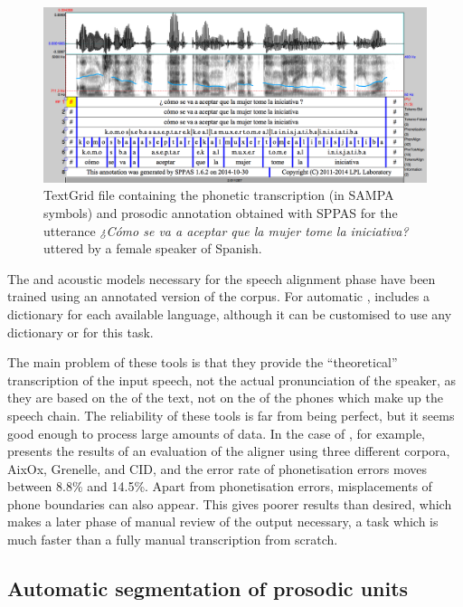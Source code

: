 \documentclass[output=paper]{langsci/langscibook}
\begin{document}
\begin{figure}
\includegraphics[width=\textwidth]{figures/GAR-img001.png}
\caption{TextGrid file containing the phonetic transcription (in SAMPA symbols) and prosodic annotation obtained with SPPAS for the utterance \textit{¿Cómo se va a aceptar que la mujer tome la iniciativa?} uttered by a female speaker of Spanish.}
\label{fig:gar:1}
\end{figure}

The  and  acoustic models necessary for the speech alignment phase have been trained using an annotated version of the  corpus. For automatic ,  includes a  dictionary for each available language, although it can be customised to use any dictionary or   for this task.\largerpage

The main problem of these tools is that they provide the ``theoretical'' transcription of the input speech, not the actual pronunciation of the speaker, as they are based on the  of the text, not on the  of the phones which make up the speech chain. The reliability of these tools is far from being perfect, but it seems good enough to process large amounts of data. In the case of , for example, \citet{Bigi2012SPPAS} presents the results of an evaluation of the  aligner using three different corpora, AixOx, Grenelle, and CID, and the error rate of phonetisation errors moves between 8.8\% and 14.5\%. Apart from phonetisation errors, misplacements of phone boundaries can also appear. This gives poorer results than desired, which makes a later phase of manual review of the output necessary, a task which is much faster than a fully manual transcription from scratch.

\subsection{Automatic segmentation of prosodic units}
\end{document}
